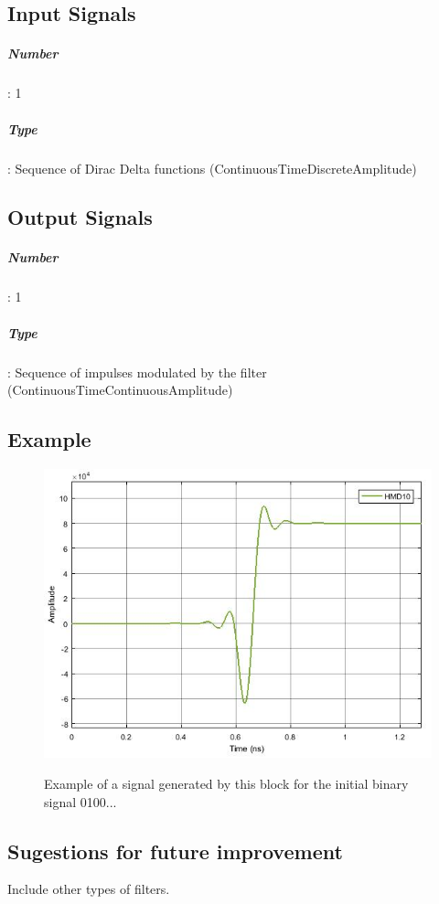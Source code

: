 \subsection*{Input Signals}

\subparagraph*{Number}: 1

\subparagraph*{Type}: Sequence of Dirac Delta functions (ContinuousTimeDiscreteAmplitude)

\subsection*{Output Signals}

\subparagraph*{Number}: 1

\subparagraph*{Type}: Sequence of impulses modulated by the filter (ContinuousTimeContinuousAmplitude)

\subsection*{Example}

\begin{figure}[h]
	\centering
	\includegraphics[width=\textwidth]{../homodyne_receiver/figures/PulseShaper_output}
	\label{MQAM6_DeterministicAppendZeros}\caption{Example of a signal generated by this block for the initial binary signal 0100...}
\end{figure}

\subsection*{Sugestions for future improvement}

Include other types of filters.
